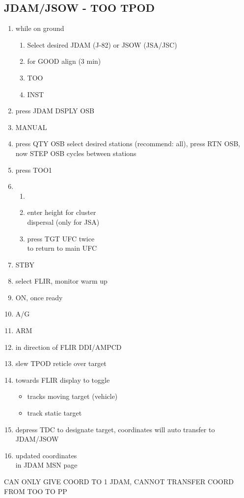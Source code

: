 \documentclass[fontInter, widesubsec]{TechCheck}
\begin{document}
	\subsection{JDAM/JSOW - TOO TPOD}
	\thumbnar
	\begin{enumerate}
		\item {}\dotfill while on ground
		\begin{enumerate}
			\item Select desired JDAM (J-82) or JSOW (JSA/JSC)
			\item {}\dotfill for GOOD align (3 min)
			\item {}\dotfill TOO
			\item {}\dotfill INST
		\end{enumerate}
		\item {}\dotfill press JDAM DSPLY OSB
		\item {}\dotfill MANUAL
		\item {}\dotfill press QTY OSB select desired stations (recommend: all), press RTN OSB, now STEP OSB cycles between stations
		\item {}\dotfill press TOO1
		\item {}
		\begin{enumerate}
			\item {}
			\item {}\dotfill enter height for cluster \\ \hfill dispersal (only for JSA)
			\item {}\dotfill press TGT UFC twice \\ \hfill to return to main UFC
		\end{enumerate}
		\item {}\dotfill STBY
		\item {}\dotfill select FLIR, monitor warm up
		\item {}\dotfill ON, once ready
		\item {}\dotfill A/G
		\item {}\dotfill ARM
		\item {}\dotfill in direction of FLIR DDI/AMPCD
		\item {}\dotfill slew TPOD reticle over target
		\item {} towards FLIR display to toggle
		\begin{itemize}
			\item {} tracks moving target (vehicle)
			\item {} track static target
		\end{itemize}
		\item {}\dotfill depress TDC to designate target, coordinates will auto transfer to JDAM/JSOW
		\item {}\dotfill updated coordinates \\ \hfill in JDAM MSN page
	\end{enumerate}
	 CAN ONLY GIVE COORD TO 1 JDAM, CANNOT TRANSFER COORD FROM TOO TO PP
\end{document}
